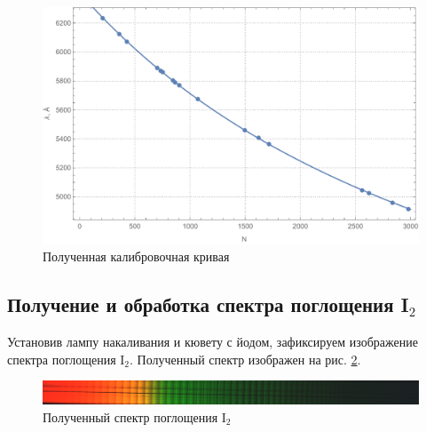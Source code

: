 \documentclass[a4paper, 12pt]{article}
\begin{document}
\begin{figure}[h]
	\centering
	\includegraphics[scale=0.7]{plot2.pdf}
	\caption{Полученная калибровочная кривая}
	\label{plot2}
\end{figure}
\subsection{Получение и обработка спектра поглощения I$_2$}
Установив лампу накаливания и кювету с йодом, зафиксируем изображение спектра поглощения I$_2$. Полученный спектр изображен на рис. \ref{i2_spec}.
\begin{figure}[!htb]
	\centering
	\includegraphics[width=\textwidth]{i2.jpeg}
	\caption{Полученный спектр поглощения I$_2$}
	\label{i2_spec}
\end{figure}
\end{document}
